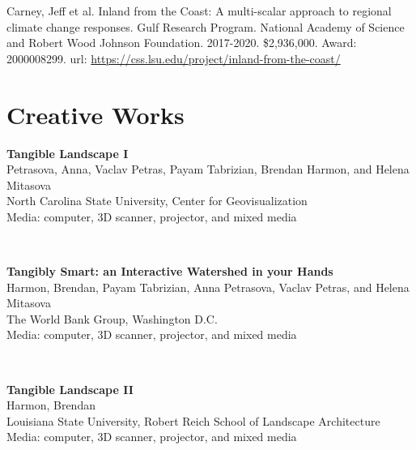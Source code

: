 \documentclass[]{baharmon-cv}
\begin{document}
Carney, Jeff et al. Inland from the Coast: A multi-scalar approach to regional climate change responses. Gulf Research Program. National Academy of Science and Robert Wood Johnson Foundation. 2017-2020. \$2,936,000. Award: 2000008299.
url: \url{https://css.lsu.edu/project/inland-from-the-coast/}\\



\section{Creative Works} 
\vspace*{1em}

\begin{minipage}[t]{0.85\textwidth}
\textbf{Tangible Landscape I}\\
Petrasova, Anna, Vaclav Petras, Payam Tabrizian, Brendan Harmon, and Helena Mitasova\\
North Carolina State University, Center for Geovisualization\\
Media: computer, 3D scanner, projector, and mixed media\\
\end{minipage}
\begin{minipage}[t]{0.15\textwidth} 
\end{minipage}\\

\begin{minipage}[t]{0.85\textwidth}
\textbf{Tangibly Smart: an Interactive Watershed in your Hands}\\
Harmon, Brendan, Payam Tabrizian, Anna Petrasova, Vaclav Petras, and Helena Mitasova\\
The World Bank Group, Washington D.C.\\
Media: computer, 3D scanner, projector, and mixed media\\
\end{minipage}
\begin{minipage}[t]{0.15\textwidth} 
\end{minipage}\\

\begin{minipage}[t]{0.85\textwidth}
\textbf{Tangible Landscape II }\\
Harmon, Brendan\\
Louisiana State University, Robert Reich School of Landscape Architecture\\
Media: computer, 3D scanner, projector, and mixed media\\
\end{minipage}
\begin{minipage}[t]{0.15\textwidth} 
\end{minipage}\\
\end{document}

